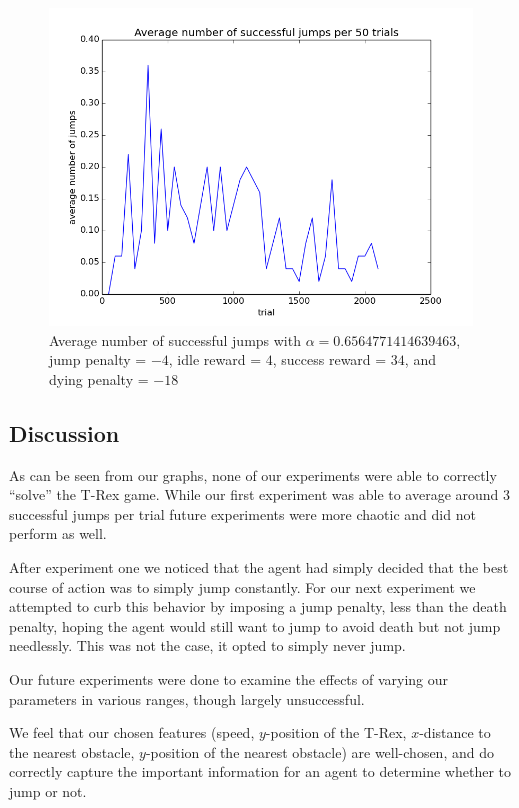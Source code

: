\documentclass{scrartcl}
\begin{document}
    \begin{figure}[H]
        \includegraphics[width=\textwidth]{../avgJumps4}
        \caption{Average number of successful jumps with $\alpha =
        0.6564771414639463$, jump penalty = $-4$, idle reward = $4$, success
        reward = $34$, and dying penalty = $-18$}
        \label{fig:exp4}
    \end{figure}

    \subsection{Discussion}
    As can be seen from our graphs, none of our experiments were able to
    correctly ``solve'' the T-Rex game. While our first experiment was able to
    average around 3 successful jumps per trial future experiments were more
    chaotic and did not perform as well.

    After experiment one we noticed that the agent had simply decided that the
    best course of action was to simply jump constantly. For our next experiment
    we attempted to curb this behavior by imposing a jump penalty, less than the
    death penalty, hoping the agent would still want to jump to avoid death but
    not jump needlessly. This was not the case, it opted to simply never jump.

    Our future experiments were done to examine the effects of varying
    our parameters in various ranges, though largely unsuccessful.

    We feel that our chosen features (speed, $y$-position of the T-Rex,
    $x$-distance to the nearest obstacle, $y$-position of the nearest obstacle)
    are well-chosen, and do correctly capture the important information for an
    agent to determine whether to jump or not.
\end{document}
